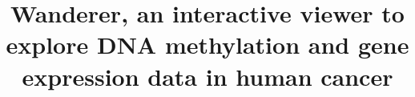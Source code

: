 \documentclass{bmcart}
\begin{document}
\begin{frontmatter}

\begin{fmbox}



\title{Wanderer, an interactive viewer to explore DNA methylation and gene expression data in human cancer}




\author[
   addressref={aff1,aff2},
   email={adiez@imppc.org},
   noteref={n1}
]{ }
\author[
   addressref={aff1,aff2},                   %
   noteref={n1},                        %
   email={imallona@imppc.org}   %
]{ }
\author[
   addressref={aff1,aff2},
   corref={aff1,aff2},
   email={map@imppc.org}
]{ }










\end{fmbox}
\end{frontmatter}
\end{document}
